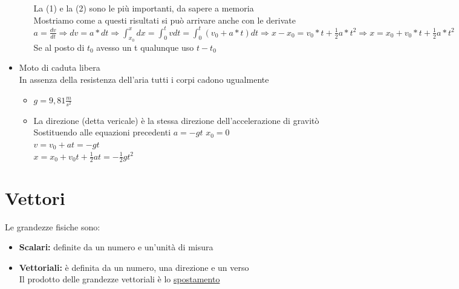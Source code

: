 \documentclass{report}
\begin{document}
\begin{itemize}
\begin{itemize}
\begin{itemize}
                \end{itemize}
                La (1) e la (2) sono le più importanti, da sapere a memoria\\
                Mostriamo come a questi risultati si può arrivare anche con le derivate\\
                $a=\frac{dv}{dt}\Rightarrow dv=a*dt\Rightarrow \int_{x_0}^{x}dx=\int_{0}^{t}vdt=\int_{0}^{t}(v_0+a*t)dt \Rightarrow x-x_0=v_0*t+\frac{1}{2}a*t^2 \Rightarrow x=x_0+v_0*t+\frac{1}{2}a*t^2$\\
                Se al posto di $t_0$ avesso un t qualunque uso $t-t_0$\\
        \end{itemize}
  \item Moto di caduta libera\\In assenza della resistenza dell'aria tutti i corpi cadono ugualmente
        \begin{itemize}


          \item $g=9,81\frac{m}{s^2}$
          \item La direzione (detta vericale) è la stessa direzione dell'accelerazione di gravitò\\Sostituendo alle equazioni precedenti $a=-gt$ $x_0=0$ \\$v=v_0+at=-gt$\\$x=x_0+v_0t+\frac{1}{2}at=-\frac{1}{2}gt^2$
        \end{itemize}
\end{itemize}
\chapter{Vettori}
Le grandezze fisiche sono:
\begin{itemize}
  \item \textbf{Scalari:} definite da un numero e un'unità di misura
  \item \textbf{Vettoriali:} è definita da un numero, una direzione e un verso\\Il prodotto delle grandezze vettoriali è lo \underline{spostamento}
\end{itemize}
\end{document}
